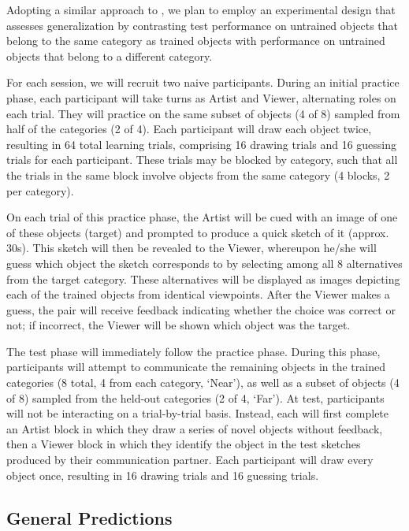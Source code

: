 \documentclass[12pt]{article}
\begin{document}
Adopting a similar approach to , we plan to employ an experimental design that assesses generalization by contrasting test performance on untrained objects that belong to the same category as trained objects with performance on untrained objects that belong to a different category. 

For each session, we will recruit two naive participants. During an initial practice phase, each participant will take turns as Artist and Viewer, alternating roles on each trial. They will practice on the same subset of objects (4 of 8) sampled from half of the categories (2 of 4). Each participant will draw each object twice, resulting in 64 total learning trials, comprising 16 drawing trials and 16 guessing trials for each participant. These trials may be blocked by category, such that all the trials in the same block involve objects from the same category (4 blocks, 2 per category). 

On each trial of this practice phase, the Artist will be cued with an image of one of these objects (target) and prompted to produce a quick sketch of it (approx. 30s). This sketch will then be revealed to the Viewer, whereupon he/she will guess which object the sketch corresponds to by selecting among all 8 alternatives from the target category. These alternatives will be displayed as images depicting each of the trained objects from identical viewpoints. After the Viewer makes a guess, the pair will receive feedback indicating whether the choice was correct or not; if incorrect, the Viewer will be shown which object was the target. 

The test phase will immediately follow the practice phase. During this phase, participants will attempt to communicate the remaining objects in the trained categories (8 total, 4 from each category, `Near'), as well as a subset of objects (4 of 8) sampled from the held-out categories (2 of 4, `Far'). At test, participants will not be interacting on a trial-by-trial basis. Instead, each will first complete an Artist block in which they draw a series of novel objects without feedback, then a Viewer block in which they identify the object in the test sketches produced by their communication partner. Each participant will draw every object once, resulting in 16 drawing trials and 16 guessing trials. 

\subsection{General Predictions}
\end{document}

